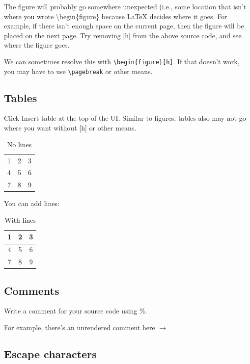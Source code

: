 \documentclass{article}
\begin{document}
The figure will probably go somewhere unexpected (i.e., some location that isn't where you wrote \textbackslash begin\{figure\} because \LaTeX{} decides where it goes. For example, if there isn't enough space on the current page, then the figure will be placed on the next page. Try removing [h] from the above source code, and see where the figure goes.

We can sometimes resolve this with \texttt{\textbackslash begin\{figure\}[h]}. If that doesn't work, you may have to use \texttt{\textbackslash pagebreak} or other means.

\subsection{Tables}

Click Insert table at the top of the UI. Similar to figures, tables also may not go where you want without [h] or other means.

\begin{table}[h]
    \centering
    \begin{tabular}{ccc}
        1 & 2 & 3\\
        4 & 5 & 6\\
        7 & 8 & 9\\
    \end{tabular}
    \caption{No lines}
\end{table}

You can add lines:

\begin{table}[h]
    \centering
    \begin{tabular}{|c|c|c|}
        \hline
        1 & 2 & 3\\
        \hline
        4 & 5 & 6\\
        \hline
        7 & 8 & 9\\
        \hline
    \end{tabular}
    \caption{With lines}
\end{table}

\subsection{Comments}

Write a comment for your source code using \%.

For example, there's an unrendered comment here $\rightarrow$ %

\subsection{Escape characters}
\end{document}

